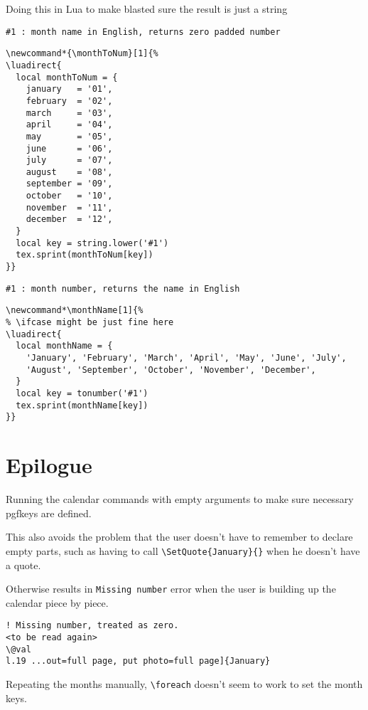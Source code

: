 \documentclass[11pt,oneside]{memoir-article}
\begin{document}
Doing this in Lua to make blasted sure the result is just a string

\begin{verbatim}
#1 : month name in English, returns zero padded number
\end{verbatim}


\begin{verbatim}
\newcommand*{\monthToNum}[1]{%
\luadirect{
  local monthToNum = {
    january   = '01',
    february  = '02',
    march     = '03',
    april     = '04',
    may       = '05',
    june      = '06',
    july      = '07',
    august    = '08',
    september = '09',
    october   = '10',
    november  = '11',
    december  = '12',
  }
  local key = string.lower('#1')
  tex.sprint(monthToNum[key])
}}
\end{verbatim}

\begin{verbatim}
#1 : month number, returns the name in English
\end{verbatim}


\begin{verbatim}
\newcommand*\monthName[1]{%
% \ifcase might be just fine here
\luadirect{
  local monthName = {
    'January', 'February', 'March', 'April', 'May', 'June', 'July',
    'August', 'September', 'October', 'November', 'December',
  }
  local key = tonumber('#1')
  tex.sprint(monthName[key])
}}
\end{verbatim}

\chapter{Epilogue}
\label{sec:orgc652671}

Running the calendar commands with empty arguments to make sure necessary
pgfkeys are defined.

This also avoids the problem that the user doesn't have to remember to declare
empty parts, such as having to call \texttt{\textbackslash{}SetQuote\{January\}\{\}} when he doesn't have
a quote.

Otherwise results in \texttt{Missing number} error when the user is building up the
calendar piece by piece.

\begin{verbatim}
! Missing number, treated as zero.
<to be read again>
\@val
l.19 ...out=full page, put photo=full page]{January}
\end{verbatim}


Repeating the months manually, \texttt{\textbackslash{}foreach} doesn't seem to work to set the month keys.
\end{document}
